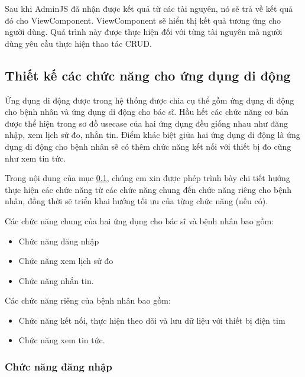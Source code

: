 Sau khi AdminJS đã nhận được kết quả từ các tài nguyên, nó sẽ trả về kết quả đó cho ViewComponent. ViewComponent sẽ hiển thị kết quả tương ứng cho người dùng. Quá trình này được thực hiện đối với từng tài nguyên mà người dùng yêu cầu thực hiện thao tác CRUD.





\subsection{Thiết kế các chức năng cho ứng dụng di động}
\label{design_function_mobile}

Ứng dụng di động được trong hệ thống được chia cụ thể gồm ứng dụng di động cho bệnh nhân và ứng dụng di động cho bác sĩ. 
Hầu hết các chức năng cơ bản được thể hiện trong sơ đồ usecase của hai ứng dụng đều giống nhau như đăng nhập, xem lịch sử đo, nhắn tin.
Điểm khác biệt giữa hai ứng dụng di động là ứng dụng di động cho bệnh nhân sẽ có thêm chức năng kết nối với thiết bị đo cũng như xem tin tức.

Trong nội dung của mục \ref{design_function_mobile}, chúng em xin được phép trình bày chi tiết hướng thực hiện các chức năng
từ các chức năng chung đến chức năng riêng cho bệnh nhân, đồng thời sẽ triển khai hướng tối ưu của từng chức năng (nếu có).

Các chức năng chung của hai ứng dụng cho bác sĩ và bệnh nhân bao gồm: 

\begin{adjustwidth}{1.5em}{}
\begin{itemize}
  \item Chức năng đăng nhập
  \item Chức năng xem lịch sử đo
  \item Chức năng nhắn tin.
\end{itemize}
\end{adjustwidth}

Các chức năng riêng của bệnh nhân bao gồm:
\begin{adjustwidth}{1.5em}{}
\begin{itemize}
  \item Chức năng kết nối, thực hiện theo dõi và lưu dữ liệu với thiết bị điện tim
  \item Chức năng xem tin tức.
\end{itemize}
\end{adjustwidth}
\subsubsection{Chức năng đăng nhập}


